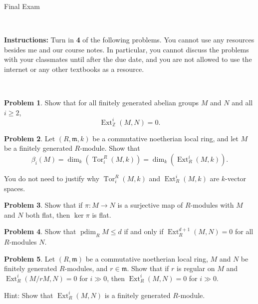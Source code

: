 \documentclass[11pt]{article}
\title{}
\date{\vspace{-0.5in}}
\DeclareMathOperator{\Tor}{Tor}
\DeclareMathOperator{\Ext}{Ext}
\DeclareMathOperator{\pdim}{pdim}
\newcommand{\m}{\mathfrak{m}}
\newcommand{\Z}{\mathbb{Z}}
\theoremstyle{definition}
\newtheorem{problem}{Problem}
\begin{document}
\thispagestyle{fancy}
\pagestyle{fancy}

\vspace{2em}

\begin{center}
	{\LARGE Final Exam}
\end{center}

\


\noindent
{\bf Instructions:}
Turn in {\bf 4} of the following problems. 
You cannot use any resources besides me and our course notes.
In particular, you cannot discuss the problems with your classmates until after the due date, and you are not allowed to use the internet or any other textbooks as a resource.

\


\begin{problem}
	Show that for all finitely generated abelian groups $M$ and $N$ and all $i \geqslant 2$,
	$$\Ext^i_\Z(M,N) = 0.$$
\end{problem}

\vfill


\begin{problem}
	Let $(R, \m, k)$ be a commutative noetherian local ring, and let $M$ be a finitely generated $R$-module. Show that
	$$\beta_i(M) = \dim_k \left( \Tor_i^R(M,k) \right) = \dim_k \left( \Ext^i_R(M,k) \right).$$
	
	\noindent
	You do not need to justify why $\Tor_i^R(M,k)$ and $\Ext^i_R(M,k)$ are $k$-vector spaces.
\end{problem}


\vfill

\begin{problem}
Show that if $\pi\!: M \to N$ is a surjective map of $R$-modules with $M$ and $N$ both flat, then $\ker \pi$ is flat.
\end{problem}


\vfill


\begin{problem}
	Show that $\pdim_R M \leqslant d$ if and only if $\Ext^{d+1}_R(M,N) = 0$ for all $R$-modules $N$.
\end{problem}

\vfill

\begin{problem}
Let $(R,\m)$ be a commutative noetherian local ring, $M$ and $N$ be finitely generated $R$-modules, and $r \in \m$. Show that if $r$ is regular on $M$ and $\Ext^i_R(M/rM,N) = 0$ for $i \gg 0$, then $\Ext^i_R(M,N) = 0$ for $i \gg 0$.

\vspace{0.5em}

	\noindent
	Hint: Show that $\Ext^i_R(M,N)$ is a finitely generated $R$-module.
\end{problem}
\end{document}
